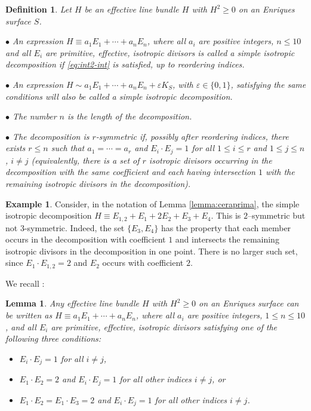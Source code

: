 \documentclass[11pt]{amsart}
\newtheorem{lemma}[thm]{Lemma}
\newtheorem{definition}[thm]{Definition}
\theoremstyle{definition}
\newtheorem{example}[thm]{Example}
\renewcommand{\leq}{\leqslant}
\begin{document}
\begin{definition} \label{def:tutte1}
 Let $H$ be  an effective line bundle $H$
with $H^ 2\geqslant 0$ on an Enriques surface $S$. 

$\bullet$ An expression
$H \equiv a_1E_1+\cdots+a_nE_{n}$, where all  $a_i$ are positive integers, $n \leq 10$ and all
 $E_i$ are primitive, effective, isotropic divisors is called  a {\em simple isotropic decomposition} if \eqref{eq:int2-int} is satisfied, up to reordering indices.


$\bullet$ An expression  $H \sim a_1E_1+\cdots+a_nE_{n} + \varepsilon K_S$, with $\varepsilon \in \{0,1\}$, satisfying the same conditions will also be called a simple isotropic decomposition. 

$\bullet$ The number $n$ is the {\em length of the decomposition}.

$\bullet$ The decomposition is {\em $r$-symmetric} if, possibly after reordering indices, there exists $r \leq n$ such
that $a_1=\cdots=a_r$ and $E_i \cdot E_j=1$ for all $1 \leq i \leq r$ and $1 \leq j \leq n$, $i\neq j$  (equivalently, there is a set of $r$ isotropic divisors occurring in the decomposition with the same coefficient and each having intersection $1$ with the remaining isotropic divisors in the decomposition). 
\end{definition}


\begin{example} \label{ex:symm}
  Consider, in the notation of Lemma \ref{lemma:ceraprima}, the simple isotropic decomposition $H \equiv E_{1,2}+E_1+2E_2+E_3+E_4$. This is $2$--symmetric but not $3$-symmetric. Indeed, the set $\{E_3, E_4\}$ has the property that each member occurs in the decomposition with coefficient $1$ and intersects the remaining isotropic divisors in the decomposition in one point. There is no larger such set, since $E_1 \cdot E_{1,2}=2$ and $E_2$ occurs with coefficient $2$.
\end{example}





We recall \cite[Lemma 2.12]{KL1}:

\begin{lemma} \label{lemma:KL}
  Any effective line bundle $H$
with $H^ 2\geqslant 0$ on an Enriques surface can be written as
$H \equiv a_1E_1+\cdots+a_nE_{n}$,
where all  $a_i$ are positive integers, $1 \leq n \leq 10$, and all
$E_i$ are primitive, effective, isotropic divisors satisfying one of the  following three conditions:
\begin{itemize}
\item[(i)] $E_i \cdot E_j=1$ for all $i \neq j$,
\item[(ii)] $E_1 \cdot E_2=2$ and $E_i \cdot E_j=1$ for all other indices
  $i \neq j$, or
\item[(iii)] $E_1 \cdot E_2=E_1 \cdot E_3=2$ and $E_i \cdot E_j=1$ for all
  other indices $i \neq j$.
\end{itemize}
\end{lemma}
\end{document}
